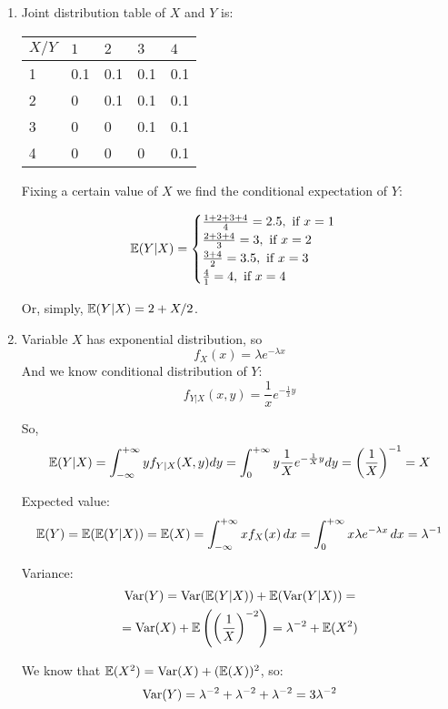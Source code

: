 \documentclass[12pt, a4paper]{article}
\begin{document}
\begin{enumerate}
\item Joint distribution table of $X$ and $Y$ is:
\begin{table}[h!]
\centering
\label{tab:discrete_eyx}
\begin{tabular}{lllll}
\toprule
$X/Y$ & $1$ & $2$ & $3$ & $4$\\
\midrule
1& 0.1 & 0.1 & 0.1 & 0.1 \\
2& 0 & 0.1 & 0.1 & 0.1 \\
3& 0 & 0 & 0.1 & 0.1 \\
4& 0 & 0 & 0 & 0.1 \\
\bottomrule
\end{tabular}
\end{table}

Fixing a certain value of $X$ we find the conditional expectation of $Y$:

\[
\mathbb{E}(Y|X) =
\begin{cases}
  \frac{1+2+3+4}{4} = 2.5, \text{ if }  x=1\\
  \frac{2+3+4}{3} = 3, \text{ if } x=2\\
  \frac{3+4}{2} = 3.5, \text{ if } x=3\\
  \frac{4}{1} = 4, \text{ if }  x=4\\
\end{cases}
\]

Or, simply, $\mathbb{E}(Y|X)=2 + X/2$.

\item Variable $X$ has exponential distribution, so
\[
f_X(x)=\lambda e^{-\lambda x}
\]
And we know conditional distribution of $Y$:
\[
f_{Y|X}(x,y)=\frac{1}{x} e^{-\frac{1}{x}y}
\]

So,
\[
\mathbb{E}(Y|X) = \int _{-\infty}^{+\infty}  y { f_{Y|X}(X,y)} dy=  \int _{0}^{+\infty} y  \frac{1}{X} e^{-\frac{1}{X}y} dy =  \left( {\frac{1}{X} }\right) ^{-1} = X
\]


Expected value:
\[
\mathbb{E}(Y) =\mathbb{E}(\mathbb{E}(Y|X)) =\mathbb{E}(X) =  \int _{-\infty}^{+\infty}x f_X(x) \, dx=  \int _{0}^{+\infty} x \lambda e^{-\lambda x} \, dx =\lambda^{-1}
\]

Variance:
\begin{multline*}
\operatorname{Var}(Y) =\operatorname{Var}(\mathbb{E}(Y|X))+ \mathbb{E}( \operatorname{Var}(Y|X)) = \\
= \operatorname{Var}(X)+ \mathbb{E} \left( \left({\frac{1}{X} }\right) ^{-2}\right)=
\lambda^{-2}+  \mathbb{E} (X^2)
\end{multline*}

We know that $ \mathbb{E} (X^2) = \operatorname{Var}(X) + (\mathbb{E}(X))^2$, so:
\[
\operatorname{Var}(Y) = \lambda^{-2}+\lambda^{-2} + \lambda^{-2} = 3\lambda^{-2}
\]


\end{enumerate}
\end{document}
